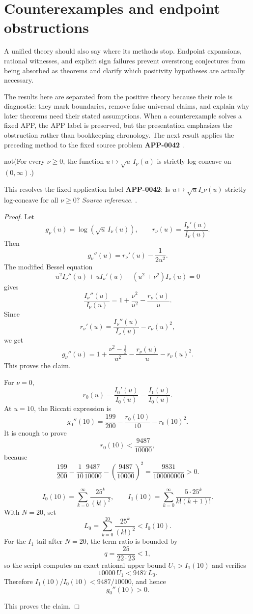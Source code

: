 \section{Counterexamples and endpoint obstructions}
A unified theory should also say where its methods stop.  Endpoint expansions, rational witnesses, and explicit sign failures prevent overstrong conjectures from being absorbed as theorems and clarify which positivity hypotheses are actually necessary.

The results here are separated from the positive theory because their role is diagnostic: they mark boundaries, remove false universal claims, and explain why later theorems need their stated assumptions.  When a counterexample solves a fixed APP, the APP label is preserved, but the presentation emphasizes the obstruction rather than bookkeeping chronology.
The next result applies the preceding method to the fixed source problem \textbf{APP-0042} \cite{app-app-0042-source}.
\begin{counterexample}
\label{res:not-bessel-i-sqrt-log-concavity-nu-ge-0}
not(For every \(\nu\ge0\), the function \(u\mapsto \sqrt{u}\,I_\nu(u)\) is strictly log-concave on \((0,\infty)\).)

This resolves the fixed application label \textbf{APP-0042}: Is \(u\mapsto \sqrt{u}I\_\nu(u)\) strictly log-concave for all \(\nu\ge0\)?
\emph{Source reference.} \cite{app-app-0042-source}.
\end{counterexample}
\begin{proof}
Let
\[
g_\nu(u)=\log(\sqrt u\,I_\nu(u)),
\qquad
r_\nu(u)=\frac{I_\nu'(u)}{I_\nu(u)}.
\]
Then
\[
g_\nu''(u)=r_\nu'(u)-\frac{1}{2u^2}.
\]
The modified Bessel equation
\[
u^2I_\nu''(u)+uI_\nu'(u)-(u^2+\nu^2)I_\nu(u)=0
\]
gives
\[
\frac{I_\nu''(u)}{I_\nu(u)}
=1+\frac{\nu^2}{u^2}-\frac{r_\nu(u)}{u}.
\]
Since
\[
r_\nu'(u)=\frac{I_\nu''(u)}{I_\nu(u)}-r_\nu(u)^2,
\]
we get
\[
g_\nu''(u)
=
1+\frac{\nu^2-\frac12}{u^2}
-\frac{r_\nu(u)}{u}
-r_\nu(u)^2.
\]
This proves the claim.

For \(\nu=0\),
\[
r_0(u)=\frac{I_0'(u)}{I_0(u)}=\frac{I_1(u)}{I_0(u)}.
\]
At \(u=10\), the Riccati expression is
\[
g_0''(10)=\frac{199}{200}-\frac{r_0(10)}{10}-r_0(10)^2.
\]
It is enough to prove
\[
r_0(10)<\frac{9487}{10000},
\]
because
\[
\frac{199}{200}
-\frac{1}{10}\frac{9487}{10000}
-\left(\frac{9487}{10000}\right)^2
=\frac{9831}{100000000}>0.
\]

\[
I_0(10)=\sum_{k=0}^{\infty}\frac{25^k}{(k!)^2},
\qquad
I_1(10)=\sum_{k=0}^{\infty}\frac{5\cdot25^k}{k!(k+1)!}.
\]
With \(N=20\), set
\[
L_0=\sum_{k=0}^{20}\frac{25^k}{(k!)^2}<I_0(10).
\]
For the \(I_1\) tail after \(N=20\), the term ratio is bounded by
\[
q=\frac{25}{22\cdot23}<1,
\]
so the script computes an exact rational upper bound \(U_1>I_1(10)\) and verifies
\[
10000\,U_1<9487\,L_0.
\]
Therefore \(I_1(10)/I_0(10)<9487/10000\), and hence
\[
g_0''(10)>0.
\]

This proves the claim.
\end{proof}

